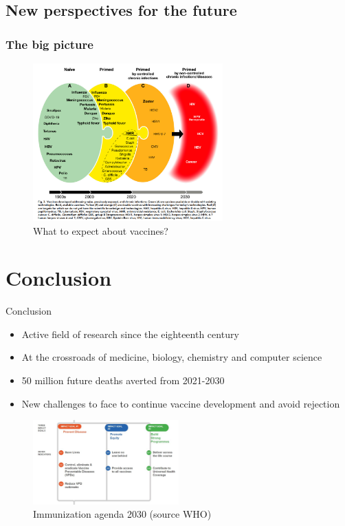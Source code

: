 \subsection{New perspectives for the future}

\begin{frame}
    \frametitle{The big picture}
    \begin{figure}
        \centering
        \includegraphics[width=0.65\textwidth]{imgs/vaccineEvolution.PNG}
        \caption{What to expect about vaccines? \autocite{rappuoliVaccinologyPostCOVID192021}}
        \label{fig:responses13}
    \end{figure}
\end{frame}



\section*{Conclusion}

\begin{frame}{Conclusion}
\begin{itemize}
    \item Active field of research since the eighteenth century
    \item At the crossroads of medicine, biology, chemistry and computer science
    \item 50 million future deaths averted from 2021-2030
    \item New challenges to face to continue vaccine development and avoid rejection
\end{itemize}
\begin{figure}
    \centering
    \includegraphics[width=0.5\textwidth]{imgs/Objectives.JPG}
    \caption{Immunization agenda 2030 (source WHO)}
    \label{fig:responses9}
\end{figure}
\end{frame}

